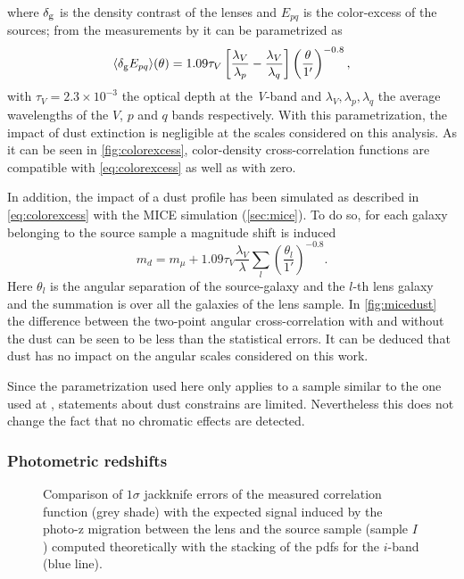 where $\delta_{\rm g}$ is the density contrast of the lenses and $E_{pq}$ is the color-excess of the sources; from the measurements by \cite{2010MNRAS.405.1025M} it can be parametrized as
\begin{equation}
\langle\delta_{\rm g}E_{pq}\rangle(\theta) = 1.09\tau_V\left[\frac{\lambda_V}{\lambda_p}-\frac{\lambda_V}{\lambda_q}\right]\left(\frac{\theta}{1'}\right)^{-0.8},
\label{eq:colorexcess}
\end{equation}
with $\tau_V=2.3\times10^{-3}$ the optical depth at the {\it V}-band  and $\lambda_V,\lambda_p,\lambda_q$ the average wavelengths of the $V$, $p$ and $q$ bands respectively. With this parametrization, the impact of dust extinction is negligible at the scales considered on this analysis. As it can be seen in \autoref{fig:colorexcess}, color-density cross-correlation functions are compatible with \autoref{eq:colorexcess} as well as with zero.
\newline

In addition, the impact of a dust profile has been simulated as described in \autoref{eq:colorexcess} with the MICE simulation (\autoref{sec:mice}). To do so, for each galaxy belonging to the source sample a magnitude shift is induced
\begin{equation}
m_d = m_\mu +1.09\tau_V\frac{\lambda_V}{\lambda}\sum\limits_{l}\left(\frac{\theta_l}{1'}\right)^{-0.8}.
\end{equation}
Here $\theta_l$ is the angular separation of the source-galaxy and the $l$-th lens galaxy and the summation is over all the galaxies of the lens sample. In \autoref{fig:micedust} the difference between the two-point angular cross-correlation with and without the dust can be seen to be less than the statistical errors. It can be deduced that dust has no impact on the angular scales considered on this work.
\newline

Since the parametrization used here only applies to a sample similar to the one used at \cite{2010MNRAS.405.1025M}, statements about dust constrains are limited. Nevertheless this does not change the fact that no chromatic effects are detected.

\subsubsection{Photometric redshifts}

\begin{figure}
\caption{Comparison of $1\sigma$ jackknife errors of the measured correlation function (grey shade) with the expected signal induced by the photo-z migration between the lens and the source sample (sample $I$) computed theoretically with the stacking of the pdfs for the $i$-band (blue line).}
\label{fig:theophotoz}
\end{figure}

